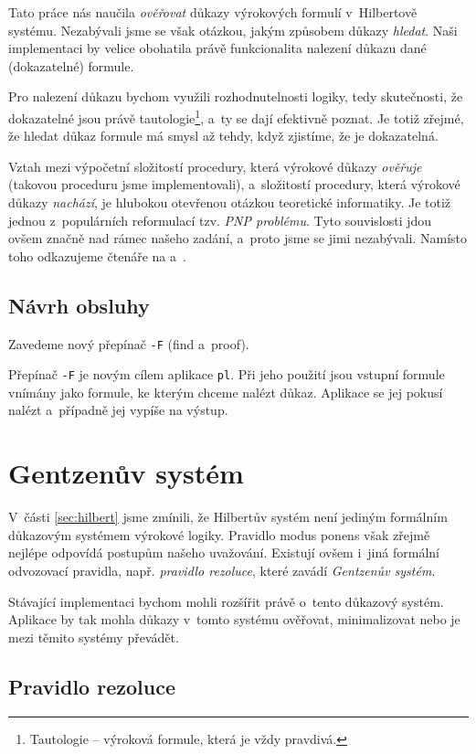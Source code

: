 \documentclass[thesis=B,czech,hidelinks]{thesis}[2012/06/26]
\begin{document}
Tato práce nás naučila \emph{ověřovat} důkazy výrokových formulí v~Hilbertově systému. Nezabývali jsme se však otázkou, jakým způsobem důkazy \emph{hledat}. Naši implementaci by velice obohatila právě funkcionalita nalezení důkazu dané (dokazatelné) formule.

Pro nalezení důkazu bychom využili rozhodnutelnosti logiky, tedy skutečnosti, že dokazatelné jsou právě tautologie\footnote{Tautologie -- výroková formule, která je vždy pravdivá.}, a~ty se dají efektivně poznat. Je totiž zřejmé, že hledat důkaz formule má smysl až tehdy, když zjistíme, že je dokazatelná.

Vztah mezi výpočetní složitostí procedury, která výrokové důkazy \emph{ověřuje} (takovou proceduru jsme implementovali), a~složitostí procedury, která výrokové důkazy \emph{nachází}, je hlubokou otevřenou otázkou teoretické informatiky. Je totiž jednou z~populárních reformulací tzv. \emph{PNP problému}. Tyto souvislosti jdou ovšem značně nad rámec našeho zadání, a~proto jsme se jimi nezabývali. Namísto toho odkazujeme čtenáře na \cite{krajicek} a~\cite{cook}.

\subsection{Návrh obsluhy}

Zavedeme nový přepínač \texttt{-F} (find a~proof).

Přepínač \texttt{-F} je novým cílem aplikace \texttt{pl}. Při jeho použití jsou vstupní formule vnímány jako formule, ke kterým chceme nalézt důkaz. Aplikace se jej pokusí nalézt a~případně jej vypíše na výstup.

\section{Gentzenův systém}
\label{sec:gentzen}

V~části \ref{sec:hilbert} jsme zmínili, že Hilbertův systém není jediným formálním důkazovým systémem výrokové logiky. Pravidlo modus ponens však zřejmě nejlépe odpovídá postupům našeho uvažování\cite{sochor}. Existují ovšem i~jiná formální odvozovací pravidla, např. \emph{pravidlo rezoluce}, které zavádí \emph{Gentzenův systém}.

Stávající implementaci bychom mohli rozšířit právě o~tento důkazový systém. Aplikace by tak mohla důkazy v~tomto systému ověřovat, minimalizovat nebo je mezi těmito systémy převádět.

\subsection{Pravidlo rezoluce}
\end{document}

